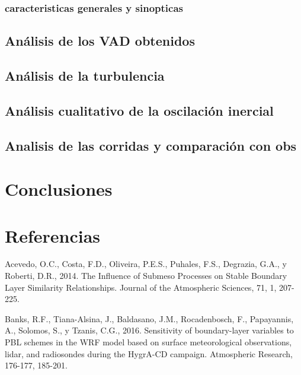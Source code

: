 \documentclass[12pt,spanish,oneside]{book}
\begin{document}
\subsection{caracteristicas generales y
sinopticas}\label{caracteristicas-generales-y-sinopticas}

\section{Análisis de los VAD
obtenidos}\label{analisis-de-los-vad-obtenidos}

\section{Análisis de la turbulencia}\label{analisis-de-la-turbulencia}

\section{Análisis cualitativo de la oscilación
inercial}\label{analisis-cualitativo-de-la-oscilacion-inercial}

\section{Analisis de las corridas y comparación con
obs}\label{analisis-de-las-corridas-y-comparacion-con-obs}

\chapter{Conclusiones}\label{conclusiones}

\chapter*{Referencias}\label{referencias}

\hypertarget{refs}{}
\hypertarget{ref-Acevedo2014}{}
Acevedo, O.C., Costa, F.D., Oliveira, P.E.S., Puhales, F.S., Degrazia,
G.A., y Roberti, D.R., 2014. The Influence of Submeso Processes on
Stable Boundary Layer Similarity Relationships. Journal of the
Atmospheric Sciences, 71, 1, 207-225.

\hypertarget{ref-Banks2016}{}
Banks, R.F., Tiana-Alsina, J., Baldasano, J.M., Rocadenbosch, F.,
Papayannis, A., Solomos, S., y Tzanis, C.G., 2016. Sensitivity of
boundary-layer variables to PBL schemes in the WRF model based on
surface meteorological observations, lidar, and radiosondes during the
HygrA-CD campaign. Atmospheric Research, 176-177, 185-201.
\end{document}
